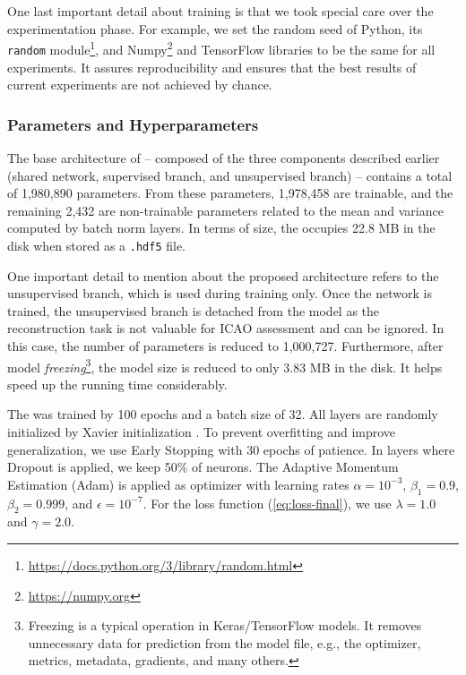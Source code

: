 One last important detail about \methodname training is that we took special care over the experimentation phase. For example, we set the random seed of Python, its \texttt{random} module\footnote{\url{https://docs.python.org/3/library/random.html}}, and Numpy\footnote{\url{https://numpy.org}} and TensorFlow libraries to be the same for all experiments. It assures reproducibility and ensures that the best results of current experiments are not achieved by chance.

\subsubsection{Parameters and Hyperparameters} \label{sec:hyperparams}

The base architecture of \methodname -- composed of the three components described earlier (shared network, supervised branch, and unsupervised branch) -- contains a total of 1,980,890 parameters. From these parameters, 1,978,458 are trainable, and the remaining 2,432 are non-trainable parameters related to the mean and variance computed by batch norm layers. In terms of size, the \methodname occupies 22.8 MB in the disk when stored as a \texttt{.hdf5} file.

One important detail to mention about the proposed architecture refers to the unsupervised branch, which is used during training only. Once the network is trained, the unsupervised branch is detached from the model as the reconstruction task is not valuable for ICAO assessment and can be ignored. In this case, the number of parameters is reduced to 1,000,727. Furthermore, after model \textit{freezing}\footnote{Freezing is a typical operation in Keras/TensorFlow models. It removes unnecessary data for prediction from the model file, e.g., the optimizer, metrics, metadata, gradients, and many others.}, the model size is reduced to only 3.83 MB in the disk. It helps speed up the running time considerably.

The \methodname was trained by 100 epochs and a batch size of 32. All layers are randomly initialized by Xavier initialization \citep{glorot2010understanding}. To prevent overfitting and improve generalization, we use Early Stopping with 30 epochs of patience. In layers where Dropout is applied, we keep 50\% of neurons. The Adaptive Momentum Estimation (Adam) is applied as optimizer with learning rates $\alpha=10^{-3}$, $\beta_1=0.9$, $\beta_2=0.999$, and $\epsilon=10^{-7}$. For the loss function (\autoref{eq:loss-final}), we use $\lambda=1.0$ and $\gamma=2.0$.

